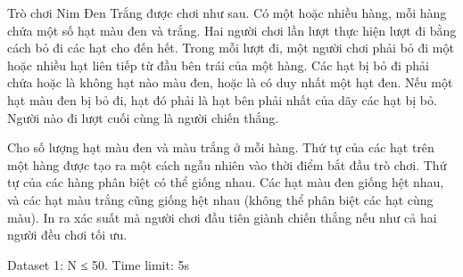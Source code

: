 Trò chơi Nim Đen Trắng được chơi như sau. Có một hoặc nhiều hàng, mỗi hàng chứa một số hạt màu đen và trắng. Hai người chơi lần lượt thực hiện lượt đi bằng cách bỏ đi các hạt cho đến hết. Trong mỗi lượt đi, một người chơi phải bỏ đi một hoặc nhiều hạt liên tiếp từ đầu bên trái của một hàng. Các hạt bị bỏ đi phải chứa hoặc là không hạt nào màu đen, hoặc là có duy nhất một hạt đen. Nếu một hạt màu đen bị bỏ đi, hạt đó phải là hạt bên phải nhất của dãy các hạt bị bỏ. Người nào đi lượt cuối cùng là người chiến thắng.  

   Cho số lượng hạt màu đen và màu trắng ở mỗi hàng. Thứ tự của các hạt trên một hàng được tạo ra một cách ngẫu nhiên vào thời điểm bắt đầu trò chơi. Thứ tự của các hàng phân biệt có thể giống nhau. Các hạt màu đen giống hệt nhau, và các hạt màu trắng cũng giống hệt nhau (không thể phân biệt các hạt cùng màu). In ra xác suất mà người chơi đầu tiên giành chiến thắng nếu như cả hai người đều chơi tối ưu.  

Dataset 1: N ≤ 50. Time limit: 5s
